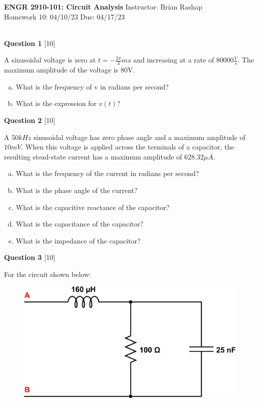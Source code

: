 \documentclass[12pt]{article}
\begin{document}
\begin{center}
\hfil
{\large\bf {ENGR 2910-101: Circuit Analysis}}
\hfill Instructor: Brian Rashap\\
Homework 10: 04/10/23 \hfill Due: 04/17/23\\
\hrulefill\\
\end{center}

{\bf Question 1} [10] %

A sinusoidal voltage is zero at $t = -\frac{2 \pi}{3} ms$ and increasing at a rate of $80000 \frac{V}{s}$. The maximum amplitude of the voltage is 80V.

\begin{enumerate}[(a)]
\item What is the frequency of v in radians per second?
\item What is the expression for $v(t)$?
\end{enumerate}

{\bf Question 2} [10] %

A $50 kHz$ sinusoidal voltage has zero phase angle and a maximum amplitude of $10mV$. When this voltage is applied across the terminals of a capacitor, the resulting stead-state current has a maximum amplitude of $628.32 \mu A$.

\begin{enumerate}[(a)]
\item What is the frequency of the current in radians per second?
\item What is the phase angle of the current?
\item What is the capacitive reactance of the capacitor?
\item What is the capacitance of the capacitor?
\item What is the impedance of the capacitor?
\end{enumerate}

{\bf Question 3} [10] %

For the circuit shown below:

\begin{figure}[h!]
\begin{center}
 \includegraphics[scale=0.4]{fig9_27.png}
\end{center}
\end{figure}
\end{document}
